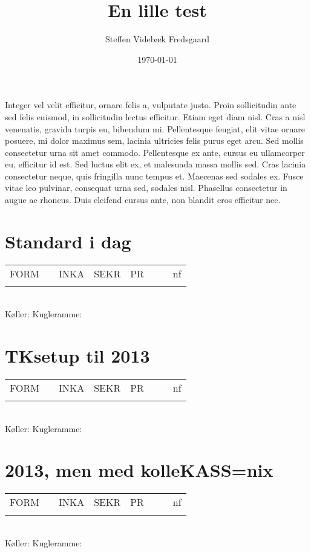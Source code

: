 \documentclass[a4paper,oneside,article]{memoir}
\newcommand{\testtext}{%
  \begin{center}
    \begin{tabular}{ *{8}{c }}
      \toprule
      FORM & \KASS & INKA & SEKR & PR & \CERM & \VC & nf \\
      \ikonFORM & \ikonKASS & \ikonINKA & \ikonSEKR & \ikonPR & \ikonCERM & \ikonVC & \ikonNF \\
      \bottomrule
    \end{tabular} \\
    Køller: \ikonKASSkoeller \qquad\qquad Kugleramme: \ikonKASSkugler
  \end{center}}
\begin{document}
\author{Steffen Videbæk Fredsgaard}
\title{En lille test}
\date{\today}
\maketitle


Integer vel velit efficitur, ornare felis a, vulputate \ikonFORM
justo. Proin sollicitudin \ikonINKA ante sed felis \ikonCERM euismod,
in sollicitudin lectus \ikonKASS efficitur. Etiam eget diam nisl. Cras
a nisl venenatis, gravida turpis eu, bibendum \ikonNF mi. Pellentesque
feugiat, elit \ikonPR vitae ornare posuere, mi dolor maximus sem,
lacinia ultricies felis purus eget \ikonVC arcu. Sed mollis
consectetur urna sit amet commodo. Pellentesque ex ante, cursus eu
ullamcorper eu, efficitur \ikonSEKR id est. Sed luctus elit ex, et
malesuada massa mollis sed. Cras lacinia consectetur neque, quis
fringilla nunc tempus et. Maecenas sed sodales ex. Fusce vitae leo
pulvinar, consequat urna sed, sodales nisl. Phasellus consectetur in
augue ac rhoncus. Duis eleifend cursus ante, non blandit eros
efficitur nec.


\chapter{Standard i dag}

\testtext


\chapter{TKsetup til 2013}

\testtext


\chapter{2013, men med kolleKASS=nix}

\testtext
\end{document}
